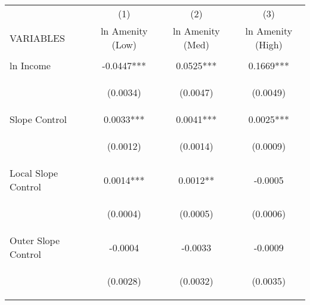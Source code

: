 
\begin{tabular}{lccc} \hline
 & (1) & (2) & (3) \\
VARIABLES & ln Amenity (Low) & ln Amenity (Med) & ln Amenity (High) \\ \hline
\vspace{4pt} & \begin{footnotesize}\end{footnotesize} & \begin{footnotesize}\end{footnotesize} & \begin{footnotesize}\end{footnotesize} \\
ln Income & -0.0447*** & 0.0525*** & 0.1669*** \\
\vspace{4pt} & \begin{footnotesize}(0.0034)\end{footnotesize} & \begin{footnotesize}(0.0047)\end{footnotesize} & \begin{footnotesize}(0.0049)\end{footnotesize} \\
Slope Control & 0.0033*** & 0.0041*** & 0.0025*** \\
\vspace{4pt} & \begin{footnotesize}(0.0012)\end{footnotesize} & \begin{footnotesize}(0.0014)\end{footnotesize} & \begin{footnotesize}(0.0009)\end{footnotesize} \\
Local Slope Control & 0.0014*** & 0.0012** & -0.0005 \\
\vspace{4pt} & \begin{footnotesize}(0.0004)\end{footnotesize} & \begin{footnotesize}(0.0005)\end{footnotesize} & \begin{footnotesize}(0.0006)\end{footnotesize} \\
Outer Slope Control & -0.0004 & -0.0033 & -0.0009 \\
 & \begin{footnotesize}(0.0028)\end{footnotesize} & \begin{footnotesize}(0.0032)\end{footnotesize} & \begin{footnotesize}(0.0035)\end{footnotesize} \\

\end{tabular}
